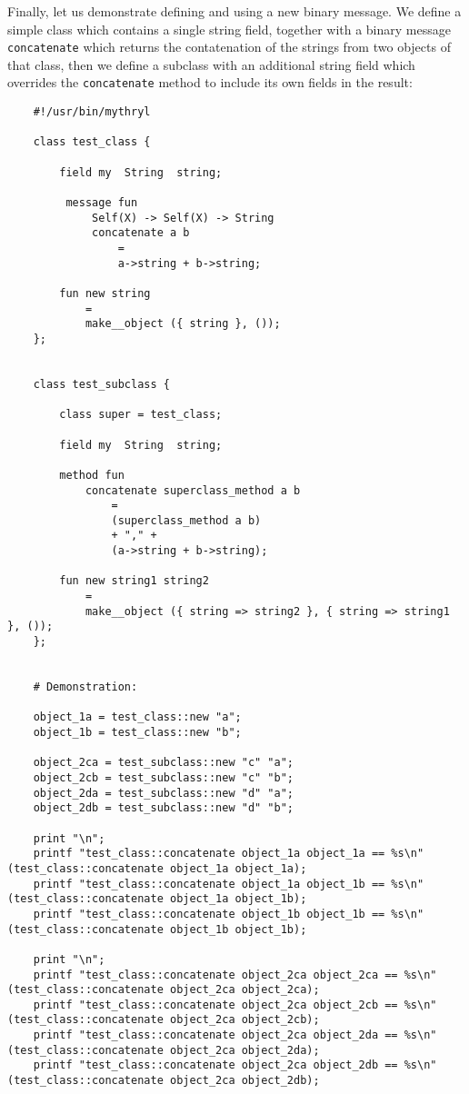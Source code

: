 Finally, let us demonstrate defining and using a new binary message. 
We define a simple class which contains a single string field, together 
with a binary message {\tt concatenate} which returns the contatenation of the strings from 
two objects of that class, then we define a subclass with an additional 
string field which overrides the {\tt concatenate} method to include its 
own fields in the result:

\begin{verbatim}
    #!/usr/bin/mythryl

    class test_class {

        field my  String  string;

         message fun
             Self(X) -> Self(X) -> String
             concatenate a b
                 =
                 a->string + b->string;

        fun new string
            =
            make__object ({ string }, ());
    };


    class test_subclass {

        class super = test_class;

        field my  String  string;

        method fun
            concatenate superclass_method a b
                =
                (superclass_method a b)
                + "," +
                (a->string + b->string);

        fun new string1 string2
            =
            make__object ({ string => string2 }, { string => string1 }, ());
    };


    # Demonstration:

    object_1a = test_class::new "a";
    object_1b = test_class::new "b";

    object_2ca = test_subclass::new "c" "a";
    object_2cb = test_subclass::new "c" "b";
    object_2da = test_subclass::new "d" "a";
    object_2db = test_subclass::new "d" "b";

    print "\n";
    printf "test_class::concatenate object_1a object_1a == %s\n" (test_class::concatenate object_1a object_1a);
    printf "test_class::concatenate object_1a object_1b == %s\n" (test_class::concatenate object_1a object_1b);
    printf "test_class::concatenate object_1b object_1b == %s\n" (test_class::concatenate object_1b object_1b);

    print "\n";
    printf "test_class::concatenate object_2ca object_2ca == %s\n" (test_class::concatenate object_2ca object_2ca);
    printf "test_class::concatenate object_2ca object_2cb == %s\n" (test_class::concatenate object_2ca object_2cb);
    printf "test_class::concatenate object_2ca object_2da == %s\n" (test_class::concatenate object_2ca object_2da);
    printf "test_class::concatenate object_2ca object_2db == %s\n" (test_class::concatenate object_2ca object_2db);


\end{verbatim}
